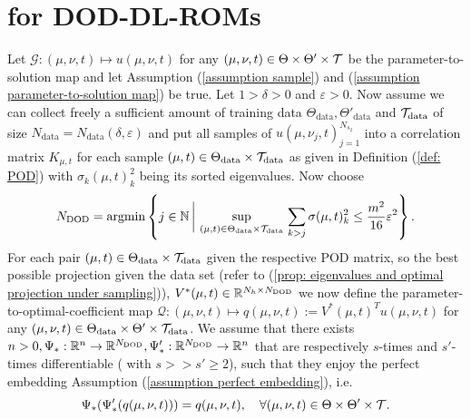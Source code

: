 \section{for DOD-DL-ROMs}



\begin{theorem} \label{theo: PAC bound for DOD-DL-ROM}
    Let $\mathcal{G}: (\mu, \nu, t) \mapsto u(\mu, \nu, t)$ for any $(\mu, \nu, t) \in \Theta \times \Theta' \times \mathcal{T}$ be the
    parameter-to-solution map and let Assumption (\ref{assumption sample}) and (\ref{assumption parameter-to-solution map}) be true. 
    Let $1 > \delta > 0$ and $\varepsilon > 0$.
    Now assume we can collect freely a sufficient amount of training data $\Theta_{\text{data}}, \Theta'_{\text{data}}$ and 
    $\mathcal{T}_{\text{data}}$ of size $N_{\text{data}} = 
    N_{\text{data}}(\delta, \varepsilon)$ and put all samples of $u(\mu, \nu_j, t)_{j=1}^{N_{s_2}}$ into a
    correlation matrix $K_{\mu, t}$ for each sample $(\mu, t) \in \Theta_{\text{data}} \times \mathcal{T}_{\text{data}}$ 
    as given in Definition (\ref{def: POD}) with $\sigma_k(\mu, t)_k^2$ being its sorted eigenvalues. 
    Now choose
    \begin{equation*}
        N_{\text{DOD}} = \operatorname{argmin} \left\{ j \in \mathbb{N} \, \bigg\vert \, 
        \sup\limits_{(\mu, t) \in \Theta_{\text{data}} \times \mathcal{T}_{\text{data}}} \,
        \sum_{k > j} \sigma(\mu, t)^2_k \leq \frac{m^2}{16} \varepsilon^2 \right\}.
    \end{equation*}
    For each pair $(\mu, t) \in \Theta_{\text{data}} \times \mathcal{T}_{\text{data}}$ given the respective POD matrix, so the 
    best possible projection given the data set (refer to (\ref{prop: eigenvalues and optimal projection under sampling})), 
    $V^*(\mu, t) \in \mathbb{R}^{N_h \times N_{\text{DOD}}}$ we now define the parameter-to-optimal-coefficient map 
    $\mathcal{Q}: (\mu, \nu, t) \mapsto q(\mu, \nu, t) := V^*(\mu, t)^T u(\mu, \nu, t)$ for 
    any $(\mu, \nu, t) \in \Theta_{\text{data}} \times \Theta' \times \mathcal{T}_{\text{data}}$. We assume that there exists 
    $n > 0, \Psi_* : \mathbb{R}^n \to \mathbb{R}^{N_{\text{DOD}}}, \Psi_*' : \mathbb{R}^{N_{\text{DOD}}} \to \mathbb{R}^n$ that are respectively $s$-times and
    $s'$-times differentiable ( with $s >> s' \geq 2$), such that they enjoy the perfect embedding 
    Assumption (\ref{assumption perfect embedding}), i.e. 
    \begin{equation*}
        \Psi_*(\Psi_*'(q(\mu, \nu, t))) = q(\mu, \nu, t), \quad \forall (\mu, \nu, t) \in \Theta \times \Theta' \times \Tcal.

\end{equation*}
\end{theorem}
